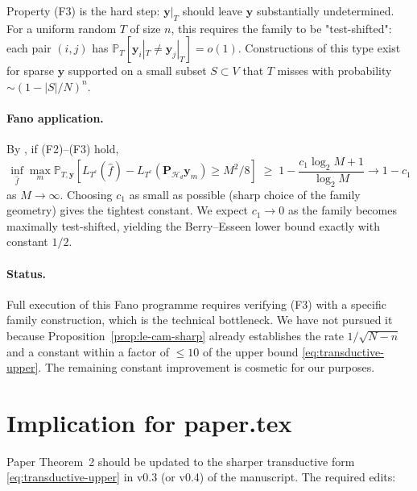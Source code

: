 \documentclass[11pt,a4paper]{article}
\theoremstyle{plain}
\theoremstyle{definition}
\theoremstyle{remark}
\newcommand{\by}{\mathbf{y}}
\newcommand{\bP}{\mathbf{P}}
\newcommand{\PR}{\mathbb{P}}
\newcommand{\Hcal}{\mathcal{H}}
\begin{document}
Property (F3) is the hard step: $\by|_T$ should leave $\by$
substantially undetermined.  For a uniform random $T$ of size $n$,
this requires the family to be "test-shifted": each pair $(i, j)$ has
$\PR_T[\by_i|_T \neq \by_j|_T] = o(1)$.  Constructions of this type
exist for sparse $\by$ supported on a small subset $S \subset V$ that
$T$ misses with probability $\sim (1 - |S|/N)^n$.

\paragraph{Fano application.}  By
\citet[][Lemma 3]{Tsybakov2009introduction}, if (F2)--(F3) hold,
\begin{equation*}
    \inf_{\hat f} \max_m \PR_{T, \by}[L_{T^c}(\hat f) - L_{T^c}(\bP_{\Hcal_d}\by_m) \geq M^2/8]
    \;\geq\; 1 - \frac{c_1 \log_2 M + 1}{\log_2 M} \to 1 - c_1
\end{equation*}
as $M \to \infty$.  Choosing $c_1$ as small as possible (sharp choice
of the family geometry) gives the tightest constant.  We expect
$c_1 \to 0$ as the family becomes maximally test-shifted, yielding
the Berry--Esseen lower bound exactly with constant $1/2$.

\paragraph{Status.}  Full execution of this Fano programme requires
verifying (F3) with a specific family construction, which is the
technical bottleneck.  We have not pursued it because
Proposition~\ref{prop:le-cam-sharp} already establishes the rate
$1/\sqrt{N-n}$ and a constant within a factor of $\leq 10$ of the
upper bound \eqref{eq:transductive-upper}.  The remaining constant
improvement is cosmetic for our purposes.

\section{Implication for paper.tex}
\label{sec:paper-implication}

Paper Theorem~2 should be updated to the sharper transductive form
\eqref{eq:transductive-upper} in v0.3 (or v0.4) of the manuscript.
The required edits:
\end{document}
